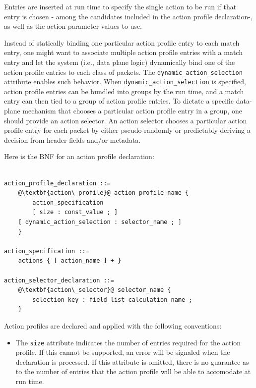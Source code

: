 \documentclass[12pt]{article}
\begin{document}
Entries are inserted at run time to specify the single action to be run if that
entry is chosen - among the candidates included in the action profile
declaration-, as well as the action parameter values to use.

Instead of statically binding one particular action profile entry to each match
entry, one might want to associate multiple action profile entries with a match
entry and let the system (i.e., data plane logic) dynamically bind one of the
action profile entries to each class of packets. The
\texttt{dynamic_action_selection} attribute enables such behavior. When
\texttt{dynamic_action_selection} is specified, action profile entries can be
bundled into groups by the run time, and a match entry can then tied to a group
of action profile entries. To dictate a specific data-plane mechanism that
chooses a particular action profile entry in a group, one should provide an
action selector. An action selector chooses a particular action profile entry
for each packet by either pseudo-randomly or predictably deriving a decision
from header fields and/or metadata.

Here is the BNF for an action profile declaration:

\begin{lstlisting}[frame=single,backgroundcolor=\color{bnfgreen},escapechar=\@]

action_profile_declaration ::=
    @\textbf{action\_profile}@ action_profile_name {
        action_specification
        [ size : const_value ; ]
	[ dynamic_action_selection : selector_name ; ]
    }

action_specification ::=
    actions { [ action_name ] + }

action_selector_declaration ::=
    @\textbf{action\_selector}@ selector_name {
        selection_key : field_list_calculation_name ;
    }

\end{lstlisting}

Action profiles are declared and applied with the following conventions:

\begin{itemize}
\item
The \texttt{size} attribute indicates the number of entries required for the
action profile. If this cannot be supported, an error will be signaled when the
declaration is processed. If this attribute is omitted, there is no guarantee as
to the number of entries that the action profile will be able to accomodate at
run time.
\end{itemize}
\end{document}
